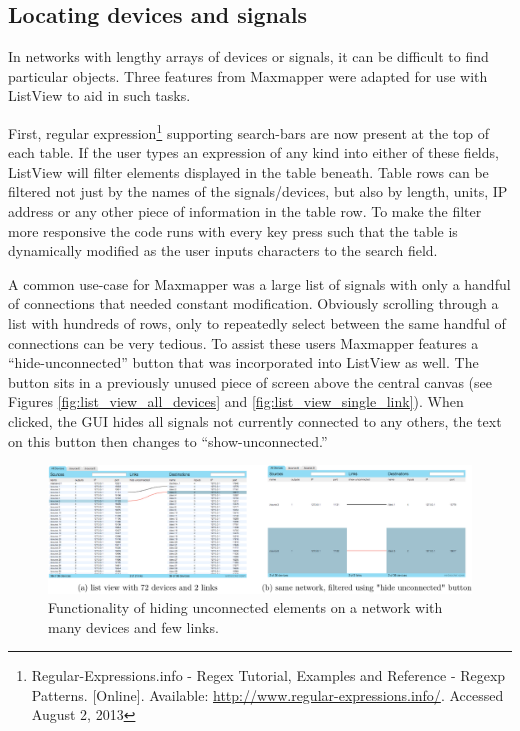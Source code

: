 
	\subsection{Locating devices and signals} %
	\label{sub:locating_devices_and_signals}

In networks with lengthy arrays of devices or signals, it can be difficult to find particular objects. Three features from Maxmapper were adapted for use with ListView to aid in such tasks.

First, regular expression\footnote{Regular-Expressions.info - Regex Tutorial, Examples and Reference - Regexp Patterns. [Online]. Available: \url{http://www.regular-expressions.info/}. Accessed August 2, 2013} supporting search-bars are now present at the top of each table. If the user types an expression of any kind into either of these fields, ListView will filter elements displayed in the table beneath. Table rows can be filtered not just by the names of the signals/devices, but also by length, units, IP address or any other piece of information in the table row. To make the filter more responsive the code runs with every key press such that the table is dynamically modified as the user inputs characters to the search field. 

A common use-case for Maxmapper was a large list of signals with only a handful of connections that needed constant modification. Obviously scrolling through a list with hundreds of rows, only to repeatedly select between the same handful of connections can be very tedious. To assist these users Maxmapper features a ``hide-unconnected'' button that was incorporated into ListView as well. The button sits in a previously unused piece of screen above the central canvas (see Figures \ref{fig:list_view_all_devices} and \ref{fig:list_view_single_link}). When clicked, the GUI hides all signals not currently connected to any others, the text on this button then changes to ``show-unconnected.''

\begin{figure}
	\centering
	\includegraphics[width=1\textwidth]{figures/hide_unconnected}
\caption{Functionality of hiding unconnected elements on a network with many devices and few links.}
\label{fig:hide_unconnected}
\end{figure}

